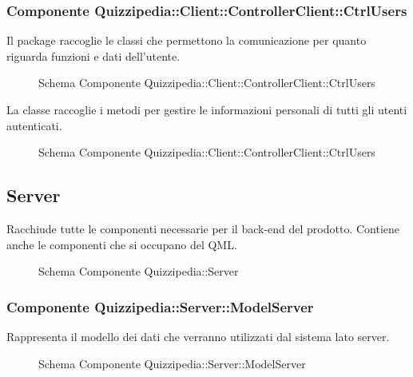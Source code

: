 \subsubsection{Componente Quizzipedia::Client::ControllerClient::CtrlUsers}
Il package raccoglie le classi che permettono la comunicazione per quanto riguarda funzioni e dati dell'utente.
\begin{figure}[H]
\centering
\noindent{}
\caption{Schema Componente Quizzipedia::Client::ControllerClient::CtrlUsers}
\end{figure}
La classe raccoglie i metodi per gestire le informazioni personali di tutti gli utenti autenticati.
\begin{figure}[H]
\centering
\noindent{}
\caption{Schema Componente Quizzipedia::Client::ControllerClient::CtrlUsers}
\end{figure}
\subsection{Server}
Racchiude tutte le componenti necessarie per il back-end del prodotto. Contiene anche le componenti che si occupano del QML.
\begin{figure}[H]
\centering
\noindent{}
\caption{Schema Componente Quizzipedia::Server}
\end{figure}
\subsubsection{Componente Quizzipedia::Server::ModelServer}
Rappresenta il modello dei dati che verranno utilizzati dal sistema lato server.
\begin{figure}[H]
\centering
\noindent{}
\caption{Schema Componente Quizzipedia::Server::ModelServer}
\end{figure}
